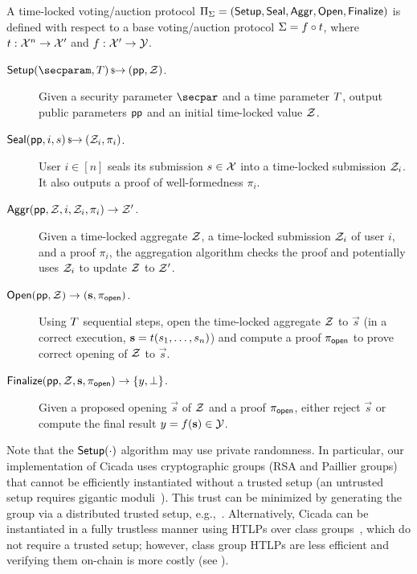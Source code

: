 \begin{definition}\label{def:syntax}
A time-locked voting/{\allowbreak}auction protocol $\Pi_\Sigma = (\mathsf{Setup}, \mathsf{Seal},\allowbreak \mathsf{Aggr}, \mathsf{Open}, \mathsf{Finalize})$ is defined with respect to a base voting/auction protocol $\Sigma = f \circ t$, where $t : \mathcal{X}^n \to \mathcal{X}'$ and $f : \mathcal{X}' \to \mathcal{Y}$. %

\begin{description}
    \item[$\Setup(\secparam, \timeT) \randout (\pparam, \Z)$.] Given a security parameter $\secpar$ and a time parameter $T$, output public parameters $\mathsf{pp}$ and an initial time-locked value $\mathcal{Z}$.
    \item[$\mathsf{Seal}(\mathsf{pp}, i, s) \,{\mbox{\scriptsize${\$}$\normalsize}\!\!\to}\hskip2.3pt (\mathcal{Z}_i, \pi_i)$.] User $i\in[n]$ seals its submission $s \in \mathcal{X}$ into a time-locked submission %
    $\mathcal{Z}_i$. It also outputs a proof of well-formedness $\pi_i$.
    \item[$\mathsf{Aggr}(\mathsf{pp}, \mathcal{Z}, i, \mathcal{Z}_i, \pi_i) \to \mathcal{Z}'$.] Given a time-locked aggregate %
    $\mathcal{Z}$, a time-locked submission $\mathcal{Z}_i$ of user $i$, and a proof $\pi_i$, the aggregation algorithm checks the proof and potentially uses $\mathcal{Z}_i$ to update $\mathcal{Z}$ to $\mathcal{Z}'$. %
    \item[$\mathsf{Open}(\mathsf{pp}, \mathcal{Z}) \to (\mathbf{s}, \pi_{\mathsf{open}})$.] Using $T$ sequential steps, open the time-locked aggregate $\mathcal{Z}$ to $\vec{s}$ (in a correct execution, $\mathbf{s} = t(s_1, \dots, s_n)$) and compute a proof $\pi_{\mathsf{open}}$ to prove correct opening of $\mathcal{Z}$ to $\vec{s}$.
    \item[$\mathsf{Finalize}(\mathsf{pp}, \mathcal{Z}, \mathbf{s}, \pi_{\mathsf{open}}) \to \{y, \perp\}$.] Given a proposed opening $\vec{s}$ of $\mathcal{Z}$ and a proof $\pi_{\sf open}$, either reject $\vec{s}$ or compute the final result $y = f(\mathbf{s}) \in \mathcal{Y}$. %
\end{description}
\end{definition}

Note that the $\mathsf{Setup}(\cdot)$ algorithm may use private randomness. In particular, our implementation of Cicada uses cryptographic groups (RSA and Paillier groups) that cannot be efficiently instantiated without a trusted setup (an untrusted setup requires gigantic moduli~\cite{ICICS:Sander99}). This trust can be minimized by generating the group via a distributed trusted setup, e.g.,~\cite{JACM:BonFra01,SP:CHIKMRsVW21,TCC:DamMik10}.
Alternatively, Cicada can be instantiated in a fully trustless manner using HTLPs over class groups~\cite{CCS:TCLM21}, which do not require a trusted setup; however, class group HTLPs are less efficient and verifying them on-chain is more costly (see ).

